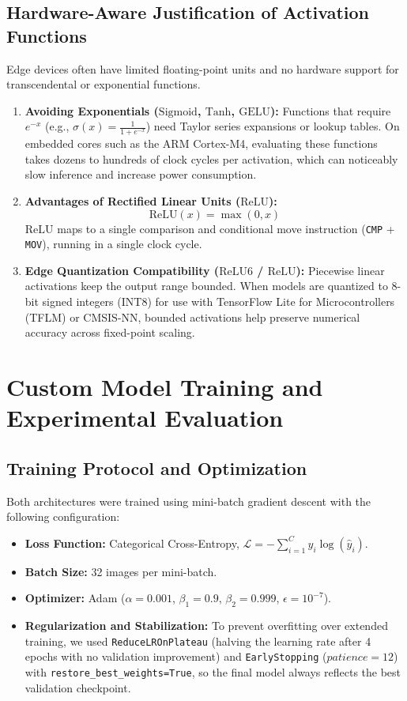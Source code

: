 \documentclass[11pt]{article}
\begin{document}
	\subsection{Hardware-Aware Justification of Activation Functions}
	Edge devices often have limited floating-point units and no hardware support for transcendental or exponential functions.
	\begin{enumerate}
		\item \textbf{Avoiding Exponentials ($\text{Sigmoid}$, $\text{Tanh}$, $\text{GELU}$):}
		Functions that require $e^{-x}$ (e.g., $\sigma(x) = \frac{1}{1 + e^{-x}}$) need Taylor series expansions or lookup tables. On embedded cores such as the ARM Cortex-M4, evaluating these functions takes dozens to hundreds of clock cycles per activation, which can noticeably slow inference and increase power consumption.
		\item \textbf{Advantages of Rectified Linear Units ($\text{ReLU}$):}
		$$\text{ReLU}(x) = \max(0, x)$$
		$\text{ReLU}$ maps to a single comparison and conditional move instruction (\texttt{CMP} + \texttt{MOV}), running in a single clock cycle.
		\item \textbf{Edge Quantization Compatibility ($\text{ReLU6}$ / $\text{ReLU}$):}
		Piecewise linear activations keep the output range bounded. When models are quantized to 8-bit signed integers ($\text{INT8}$) for use with TensorFlow Lite for Microcontrollers (TFLM) or CMSIS-NN, bounded activations help preserve numerical accuracy across fixed-point scaling.
	\end{enumerate}

	\section{Custom Model Training and Experimental Evaluation}
	\subsection{Training Protocol and Optimization}
	Both architectures were trained using mini-batch gradient descent with the following configuration:
	\begin{itemize}
		\item \textbf{Loss Function:} Categorical Cross-Entropy, $\mathcal{L} = -\sum_{i=1}^{C} y_i \log(\hat{y}_i)$.
		\item \textbf{Batch Size:} 32 images per mini-batch.
		\item \textbf{Optimizer:} Adam ($\alpha = 0.001$, $\beta_1 = 0.9$, $\beta_2 = 0.999$, $\epsilon = 10^{-7}$).
		\item \textbf{Regularization and Stabilization:} 
		To prevent overfitting over extended training, we used \texttt{ReduceLROnPlateau} (halving the learning rate after 4 epochs with no validation improvement) and \texttt{EarlyStopping} ($patience=12$) with \texttt{restore\_best\_weights=True}, so the final model always reflects the best validation checkpoint.
	\end{itemize}
\end{document}
